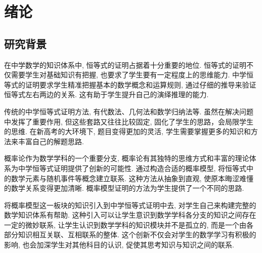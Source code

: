 
\chapter{绪论}
\section{研究背景}

在中学数学的知识体系中, 恒等式的证明占据着十分重要的地位. 恒等式的证明不仅需要学生对基础知识有把握, 也要求了学生要有一定程度上的思维能力. 中学恒等式的证明要求学生精准把握基本的数学概念和运算规则, 通过仔细的推导来验证恒等式左右两边的关系. 这有助于学生提升自己的演绎推理的能力. 

传统的中学恒等式证明方法, 有代数法、几何法和数学归纳法等. 虽然在解决问题中发挥了重要作用, 但这些套路又往往比较固定, 固化了学生的思路，会局限学生的思维. 在新高考的大环境下, 题目变得更加的灵活, 学生需要掌握更多的知识和方法来丰富自己的解题思路. 


概率论作为数学学科的一个重要分支, 概率论有其独特的思维方式和丰富的理论体系为中学恒等式证明提供了创新的可能性. 通过构造合适的概率模型, 将恒等式中的数学元素与随机事件等概念建立联系. 这种方法从抽象到直观, 使原本晦涩难懂的数学关系变得更加清晰. 概率模型证明的方法为学生提供了一个不同的思路. 

将概率模型这一板块的知识引入到中学恒等式证明中去, 对学生自己来构建完整的数学知识体系有帮助. 这种引入可以让学生意识到数学学科各分支的知识之间存在一定的微妙联系, 让学生认识到数学学科的知识模块并不是孤立的, 而是一个由各部分知识相互关联、互相联系的整体. 这个创新不仅会对学生的数学学习有积极的影响, 也会加深学生对其他科目的认识, 促使其思考知识与知识之间的联系. 



